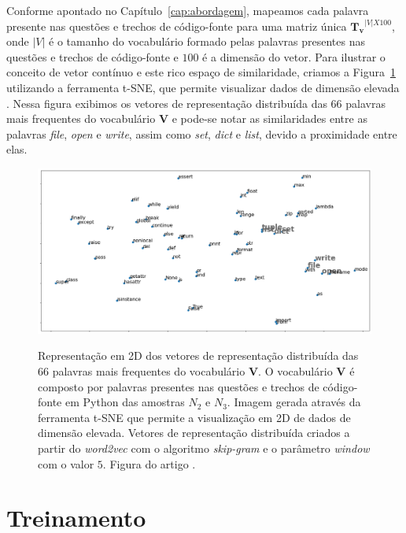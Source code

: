 Conforme apontado no Capítulo~\ref{cap:abordagem}, mapeamos cada palavra presente nas questões e trechos de código-fonte para uma matriz única $\bm{T_{v}}^{|V| X 100}$, onde $|V|$ é o tamanho do vocabulário formado pelas palavras presentes nas questões e trechos de código-fonte e $100$ é a dimensão do vetor. Para ilustrar o conceito de vetor contínuo e este rico espaço de similaridade, criamos a Figura~\ref{fig:tsne-code-snippet-python} utilizando a ferramenta t-SNE, que permite visualizar dados de dimensão elevada \cite{scikit-learn-tsne-2019, quora-tsne-2019}. Nessa figura exibimos os vetores de representação distribuída das 66 palavras mais frequentes do vocabulário $\bm{V}$ e pode-se notar as similaridades entre as palavras \emph{file}, \emph{open}  e \emph{write}, assim como \emph{set}, \emph{dict} e \emph{list}, devido a proximidade entre elas.

\begin{figure}[H]
\caption[Representação em 2D dos vetores de representação distribuída das 66 palavras mais frequentes do vocabulário $\bm{V}$.]{Representação em 2D dos vetores de representação distribuída das 66 palavras mais frequentes do vocabulário $\bm{V}$. O vocabulário $\bm{V}$ é composto por palavras presentes nas questões e trechos de código-fonte em Python das amostras $N_{2}$ e $N_{3}$. Imagem gerada através da ferramenta t-SNE que permite a visualização em 2D de dados de dimensão elevada. Vetores de representação distribuída criados a partir do \textit{word2vec} com o algoritmo \textit{skip-gram} e o parâmetro \textit{window} com o valor $5$. Figura do artigo .}
\includegraphics[width=1\textwidth]{figuras/cap-experimento/code_tsne.png}
\label{fig:tsne-code-snippet-python}
\end{figure}

\section{Treinamento}
\label{sec:treinamento}

